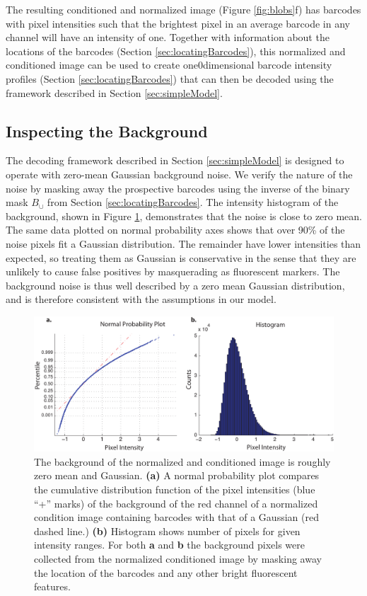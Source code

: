 The resulting conditioned and normalized image (Figure \ref{fig:blobs}f) has barcodes with pixel intensities such that the brightest pixel in an average barcode in any channel will have an intensity of one.  Together with information about the locations of the barcodes (Section \ref{sec:locatingBarcodes}), this normalized and conditioned image can be used to create one0dimensional barcode intensity profiles (Section \ref{sec:locatingBarcodes}) that can then be decoded using the framework described in Section \ref{sec:simpleModel}.

\subsection{Inspecting the Background}
The decoding framework described in Section \ref{sec:simpleModel} is designed to operate with zero-mean Gaussian background noise. We verify the nature of the noise by masking away the prospective barcodes using the inverse of the binary mask $B_{\cup}$ from Section \ref{sec:locatingBarcodes}.  The intensity histogram of the background, shown in Figure \ref{fig:noisePlots}, demonstrates that the noise is close to zero mean. The same data plotted on normal probability axes shows that over 90\% of the noise pixels fit a Gaussian distribution. The remainder have lower intensities than expected, so treating them as Gaussian is conservative in the sense that they are unlikely to cause false positives by masquerading as fluorescent markers. The background noise is thus well described by a zero mean Gaussian distribution, and is therefore consistent with the assumptions in our model.
\begin{figure}[htbp]
\begin{center}
	\includegraphics[width=\textwidth]{figures/theoryBackgroundStatistics}
	\caption{The background of the normalized and conditioned image is roughly zero mean and Gaussian.  \textbf{(a)} A normal probability plot compares the cumulative distribution function of the pixel intensities (blue ``+'' marks) of the background of the red channel of a normalized condition image containing barcodes  with that of a Gaussian (red dashed line.)  \textbf{(b)} Histogram shows number of pixels for given intensity ranges. For both \textbf{a} and \textbf{b} the background pixels were collected from the normalized conditioned image by masking away the location of the barcodes and any other bright fluorescent features.   \label{fig:noisePlots}}
\end{center}	
\end{figure}


